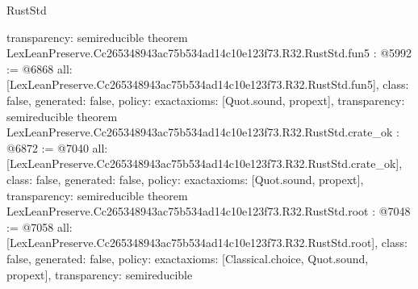 \begin{lexlean}{RustStd}
\begin{coremodule}
{  transparency: semireducible
}
theorem LexLeanPreserve.Cc265348943ac75b534ad14c10e123f73.R32.RustStd.fun5 : @5992 := @6868 {
  all: [LexLeanPreserve.Cc265348943ac75b534ad14c10e123f73.R32.RustStd.fun5],
  class: false,
  generated: false,
  policy: exact{axioms: [Quot.sound, propext]},
  transparency: semireducible
}
theorem LexLeanPreserve.Cc265348943ac75b534ad14c10e123f73.R32.RustStd.crate_ok : @6872 := @7040 {
  all: [LexLeanPreserve.Cc265348943ac75b534ad14c10e123f73.R32.RustStd.crate_ok],
  class: false,
  generated: false,
  policy: exact{axioms: [Quot.sound, propext]},
  transparency: semireducible
}
theorem LexLeanPreserve.Cc265348943ac75b534ad14c10e123f73.R32.RustStd.root : @7048 := @7058 {
  all: [LexLeanPreserve.Cc265348943ac75b534ad14c10e123f73.R32.RustStd.root],
  class: false,
  generated: false,
  policy: exact{axioms: [Classical.choice, Quot.sound, propext]},
  transparency: semireducible
}


\end{coremodule}
\end{lexlean}

